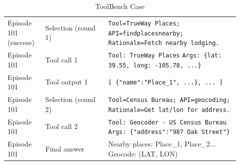 \documentclass[11pt]{article}
\begin{document}
\begin{table}[htbp]
{\begin{tabular}{@{}p{0.15\linewidth} p{0.25\linewidth} p{0.52\linewidth}@{}}
\midrule

Episode 101 (success) &
Selection (round 1) &
\texttt{Tool=TrueWay Places; API=findplacesnearby;} \newline
\texttt{Rationale=Fetch nearby lodging.} \\

Episode 101 &
Tool call 1 &
\texttt{Tool: TrueWay Places} \newline
\texttt{Args: \{lat: 39.55, long: -105.78, ...\}} \\

Episode 101 &
Tool output 1 &
\texttt{[ \{"name":"Place\_1", ...\}, ... ]} \\

Episode 101 &
Selection (round 2) &
\texttt{Tool=Census Bureau; API=geocoding;} \newline
\texttt{Rationale=Get lat/lon for address.} \\

Episode 101 &
Tool call 2 &
\texttt{Tool: Geocoder - US Census Bureau} \newline
\texttt{Args: \{"address":"987 Oak Street"\}} \\

Episode 101 &
Final answer &
Nearby places: Place\_1, Place\_2... \newline
Geocode: (LAT, LON) \\

\bottomrule
\end{tabular}
}
\caption{ToolBench Case}
\label{tab:evotool-toolbench-case}
\end{table}
\end{document}
